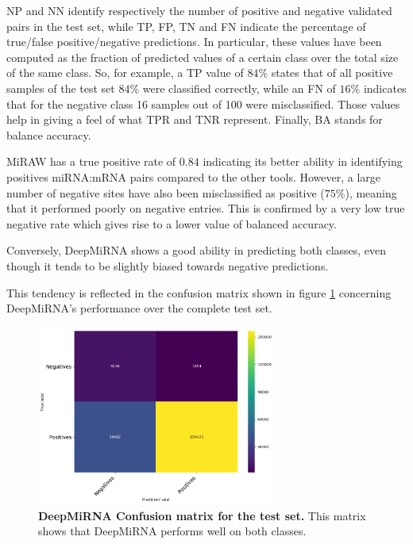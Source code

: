 NP and NN identify respectively the number of positive and negative validated pairs in the test set, while TP, FP, TN and FN indicate the percentage of true/false positive/negative predictions. 
In particular, these values have been computed as the fraction of predicted values of a certain class over the total size of the same class. So, for example, a TP value of $84\%$ states that of all positive samples of the test set $84\%$ were classified correctly, while an FN of $16\%$ indicates that for the negative class 16 samples out of 100 were misclassified. Those values help in giving a feel of what TPR and TNR represent. Finally, BA stands for balance accuracy.
 
MiRAW has a true positive rate of $0.84$ indicating its better ability in identifying positives miRNA:mRNA pairs compared to the other tools. However, a large number of negative sites have also been misclassified as positive ($75\%$), meaning that it performed poorly on negative entries. This is confirmed by a very low true negative rate which gives rise to a lower value of balanced accuracy.

Conversely, DeepMiRNA shows a good ability in predicting both classes, even though it tends to be slightly biased towards negative predictions. 

This tendency is reflected in the confusion matrix shown in figure \ref{fig:confusion_matrix} concerning DeepMiRNA's performance over the complete test set.

\begin{figure}[h!]
	\centering
	\includegraphics[width=0.7\textwidth, height=0.4\textheight]{Figures/conf_matrix}
	\caption{\textbf{DeepMiRNA Confusion matrix for the test set.} This matrix shows that DeepMiRNA performs well on both classes.}
	\label{fig:confusion_matrix}
\end{figure} 
  


 